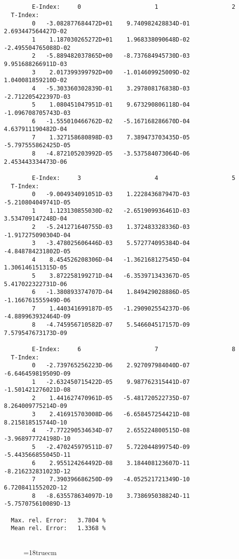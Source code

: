\begin{verbatim}


        E-Index:     0                     1                     2
  T-Index:
        0   -3.082877684472D+01    9.740982428834D-01    2.693447564427D-02
        1    1.187030265272D+01    1.968338090648D-02   -2.495504765088D-02
        2   -5.889482037865D+00   -8.737684945730D-03    9.951688266911D-03
        3    2.017399399792D+00   -1.014609925009D-02    1.040081859210D-02
        4   -5.303360302839D-01    3.297808176838D-03   -2.712205422397D-03
        5    1.080451047951D-01    9.673290806118D-04   -1.096708705743D-03
        6   -1.555010466762D-02   -5.167168286670D-04    4.637911190482D-04
        7    1.327158680898D-03    7.389473703435D-05   -5.797555862425D-05
        8   -4.872105203992D-05   -3.537584073064D-06    2.453443334473D-06

        E-Index:     3                     4                     5
  T-Index:
        0   -9.004934091051D-03    1.222843687947D-03   -5.210804049741D-05
        1    1.123130855030D-02   -2.651909936461D-03    3.534709147248D-04
        2   -5.241271640755D-03    1.372483328336D-03   -1.917275090304D-04
        3   -3.478025606446D-03    5.572774095384D-04   -4.848784231802D-05
        4    8.454526208306D-04   -1.362168127545D-04    1.306146151315D-05
        5    3.872258199271D-04   -6.353971343367D-05    5.417022322731D-06
        6   -1.380893374707D-04    1.849429028886D-05   -1.166761555949D-06
        7    1.440341699187D-05   -1.290902554237D-06   -4.889963932464D-09
        8   -4.745956710582D-07    5.546604517157D-09    7.579547673173D-09

        E-Index:     6                     7                     8
  T-Index:
        0   -2.739765256223D-06    2.927097984040D-07   -6.646459819509D-09
        1   -2.632450715422D-05    9.987762315441D-07   -1.501421276021D-08
        2    1.441627470961D-05   -5.481720522735D-07    8.264009775214D-09
        3    2.416915703008D-06   -6.658457254421D-08    8.215818515744D-10
        4   -7.772290534634D-07    2.655224800515D-08   -3.968977724198D-10
        5   -2.470245979511D-07    5.722044899754D-09   -5.443566855045D-11
        6    2.955124264492D-08    3.184408123607D-11   -8.216232831023D-12
        7    7.390396686250D-09   -4.052521721349D-10    6.720841155202D-12
        8   -8.635578634097D-10    3.738695038824D-11   -5.757075610089D-13

  Max. rel. Error:   3.7804 %
  Mean rel. Error:   1.3368 %


\end{verbatim}
\begin{figure} \label{2.1.5a}
\epsfxsize=18truecm
\end{figure}

